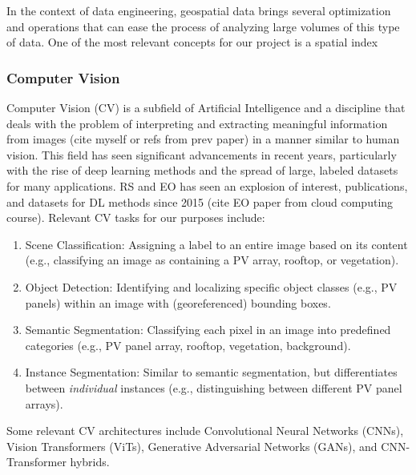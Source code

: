 \begin{multicols}{2}
In the context of data engineering, geospatial data brings several optimization and operations that can ease the process of analyzing large volumes of this type of data.
One of the most relevant concepts for our project is a spatial index 


\subsubsection{Computer Vision}

Computer Vision (CV) is a subfield of Artificial Intelligence and a discipline that deals with the problem of interpreting and extracting meaningful information from images (cite myself or refs from prev paper) 
in a manner similar to human vision. This field has seen significant advancements in recent years, particularly with the rise of deep learning methods and the spread of large, labeled datasets for many applications. 
RS and EO has seen an explosion of interest, publications, and datasets for DL methods since 2015 (cite EO paper from cloud computing course). Relevant CV tasks for our purposes include:

\begin{enumerate}
    \item Scene Classification: Assigning a label to an entire image based on its content (e.g., classifying an image as containing a PV array, rooftop, or vegetation).
    \item Object Detection: Identifying and localizing specific object classes (e.g., PV panels) within an image with (georeferenced) bounding boxes.
    \item Semantic Segmentation: Classifying each pixel in an image into predefined categories (e.g., PV panel array, rooftop, vegetation, background).
    \item Instance Segmentation: Similar to semantic segmentation, but differentiates between \textit{individual} instances (e.g., distinguishing between different PV panel arrays). 
\end{enumerate}

Some relevant CV architectures include Convolutional Neural Networks (CNNs), Vision Transformers (ViTs), Generative Adversarial Networks (GANs), and CNN-Transformer hybrids. 



\end{multicols}
